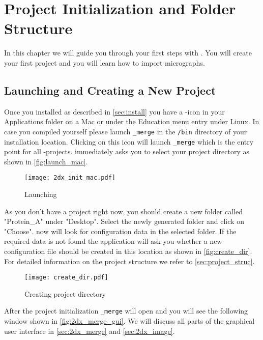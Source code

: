 \section{Project Initialization and Folder Structure}

In this chapter we will guide you through your first steps with {\twodx}. You will create your first project and you will learn how to import micrographs.

\subsection{Launching {\twodx} and Creating a New Project}
Once you installed {\twodx} as described in \autoref{sec:install} you have a {\twodx}-icon in your Applications folder on a Mac or under the Education menu entry under Linux. In case you compiled {\twodx} yourself please launch {\twodx}\texttt{\_merge} in the \texttt{/bin} directory of your installation location. Clicking on this icon will launch {\twodx}\texttt{\_merge} which is the entry point for all {\twodx}-projects. {\twodx} immediately asks you to select your project directory as shown in \autoref{fig:launch_mac}.

\begin{figure}[H]
	\centering
	\texttt{[image: 2dx\_init\_mac.pdf]}
	\caption{Launching {\twodx}}
	\label{fig:launch_mac}
\end{figure}

As you don't have a project right now, you should create a new folder called "Protein\_A" under "Desktop". Select the newly generated folder and click on "Choose". {\twodx} now will look for configuration data in the selected folder. If the required data is not found the application will ask you whether a new configuration file should be created in this location as shown in \autoref{fig:create_dir}. For detailed information on the project structure we refer to \autoref{sec:project_struc}.

\begin{figure}[H]
	\centering
	\texttt{[image: create\_dir.pdf]}
	\caption{Creating project directory}
	\label{fig:create_dir}
\end{figure}

After the project initialization {\twodx}\texttt{\_merge} will open and you will see the following window shown in \autoref{fig:2dx_merge_gui}. We will discuss all parts of the {\twodx} graphical user interface in \autoref{sec:2dx_merge} and \autoref{sec:2dx_image}.

